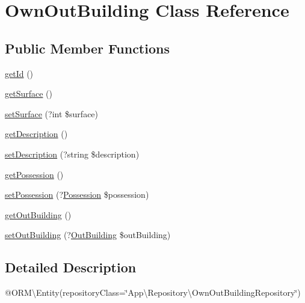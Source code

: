 \hypertarget{class_app_1_1_entity_1_1_own_out_building}{}\section{Own\+Out\+Building Class Reference}
\label{class_app_1_1_entity_1_1_own_out_building}
\subsection*{Public Member Functions}
\begin{DoxyCompactItemize}
\item 
\mbox{\hyperlink{class_app_1_1_entity_1_1_own_out_building_a12251d0c022e9e21c137a105ff683f13}{get\+Id}} ()
\item 
\mbox{\hyperlink{class_app_1_1_entity_1_1_own_out_building_a282b0af88968ac8e268c0f21cdf5f034}{get\+Surface}} ()
\item 
\mbox{\hyperlink{class_app_1_1_entity_1_1_own_out_building_a0cc7d745f571f40e9bc6a30bfece6159}{set\+Surface}} (?int \$surface)
\item 
\mbox{\hyperlink{class_app_1_1_entity_1_1_own_out_building_a2e7bb35c71bf1824456ceb944cb7a845}{get\+Description}} ()
\item 
\mbox{\hyperlink{class_app_1_1_entity_1_1_own_out_building_acee77db44e361e2773e2734033f2a1c5}{set\+Description}} (?string \$description)
\item 
\mbox{\hyperlink{class_app_1_1_entity_1_1_own_out_building_a4ad5c74255a75f0d61664cba32657af7}{get\+Possession}} ()
\item 
\mbox{\hyperlink{class_app_1_1_entity_1_1_own_out_building_ad625cd7a23ddbd219c5f6b58e85f2977}{set\+Possession}} (?\mbox{\hyperlink{class_app_1_1_entity_1_1_possession}{Possession}} \$possession)
\item 
\mbox{\hyperlink{class_app_1_1_entity_1_1_own_out_building_a4bad965fdaae53c2636fc63ca1502f78}{get\+Out\+Building}} ()
\item 
\mbox{\hyperlink{class_app_1_1_entity_1_1_own_out_building_a022759bfbde1514bbfcf0d823f056d3a}{set\+Out\+Building}} (?\mbox{\hyperlink{class_app_1_1_entity_1_1_out_building}{Out\+Building}} \$out\+Building)
\end{DoxyCompactItemize}


\subsection{Detailed Description}
@\+O\+RM\textbackslash{}\+Entity(repository\+Class=\char`\"{}\+App\textbackslash{}\+Repository\textbackslash{}\+Own\+Out\+Building\+Repository\char`\"{}) 


